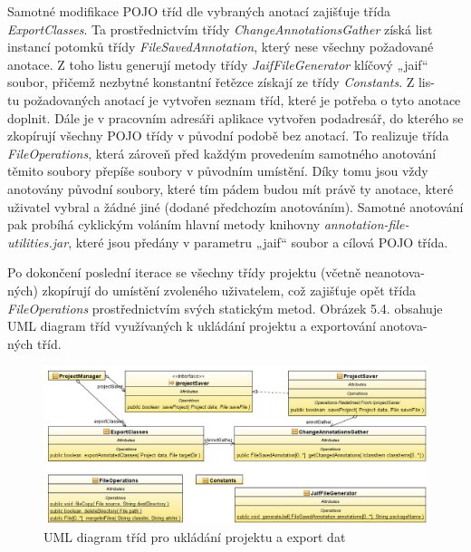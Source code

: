 \documentclass{projekt}
\begin{document}
Samotné modifikace POJO tříd dle vybraných anotací zajišťuje třída {\it ExportClasses}. Ta prostřednictvím třídy {\it ChangeAnnotationsGather} získá list instancí potomků třídy {\it FileSavedAnnotation}, který nese všechny požadované anotace. Z toho listu generují metody třídy {\it JaifFileGenerator} klíčový „jaif“ soubor, přičemž nezbytné konstantní řetězce získají ze třídy {\it Constants}. Z lis-\\tu požadovaných anotací je vytvořen seznam tříd, které je potřeba o tyto anotace doplnit. Dále je v pracovním adresáři aplikace vytvořen podadresář, do kterého se zkopírují všechny POJO třídy v původní podobě bez anotací. To realizuje třída {\it FileOperations}, která zároveň před každým provedením samotného anotování těmito soubory přepíše soubory v původním umístění. Díky tomu jsou vždy anotovány původní soubory, které tím pádem budou mít právě ty anotace, které uživatel vybral a žádné jiné (dodané předchozím anotováním). Samotné anotování pak probíhá cyklickým voláním hlavní metody knihovny {\it annotation-file-utilities.jar}, které jsou předány v parametru „jaif“ soubor a cílová POJO třída.


Po dokončení poslední iterace se všechny třídy projektu (včetně neanotova-\\ných) zkopírují do umístění zvoleného uživatelem, což zajišťuje opět třída {\it FileOperations} prostřednictvím svých statickým metod. Obrázek 5.4. obsahuje UML diagram tříd využívaných k ukládání projektu a exportování anotova-\\ných tříd. 

\begin{figure}[htb!]
\begin{center}
\includegraphics[scale=0.38]{Aplikacni3.png}
\caption{UML diagram tříd pro ukládání projektu a export dat}
\end{center}
\end{figure}
\end{document}
